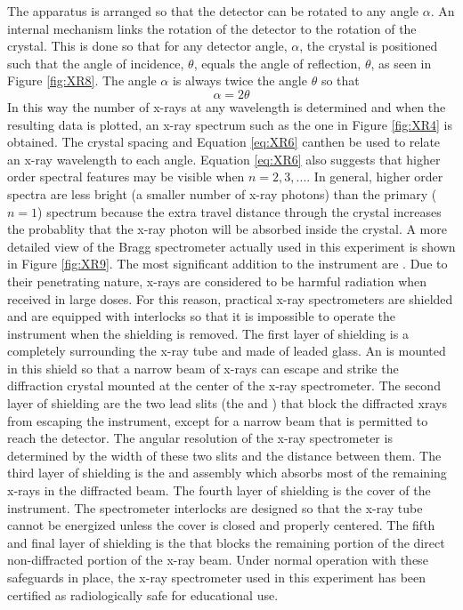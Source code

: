 \documentclass[12pt, a4paper, oneside, openright, titlepage]{book}
\begin{document}
\noindent The apparatus is arranged so that the detector can be rotated to any angle $\alpha$. An internal mechanism links the rotation of the detector to the rotation of the crystal. This is done so that for any detector angle, $\alpha$, the crystal is positioned such that the angle of incidence, $\theta$, equals the angle of reflection, $\theta$, as seen in Figure \ref{fig:XR8}. The angle $\alpha$ is always twice the angle $\theta$ so that \begin{equation}\label{eq:XR7}
    \alpha = 2\theta
\end{equation}
In this way the number of x-rays at any wavelength is determined and when the resulting data is plotted, an x-ray spectrum such as the one in Figure \ref{fig:XR4} is obtained. The crystal spacing and Equation \ref{eq:XR6} canthen be used to relate an x-ray wavelength to each angle. Equation \ref{eq:XR6} also suggests that higher order spectral features may be visible when $n = 2, 3, ... $. In general, higher order spectra are less bright (a smaller number of x-ray photons) than the primary ($n = 1$) spectrum because the extra travel distance through the crystal increases the probablity that the x-ray photon will be absorbed inside the crystal. A more detailed view of the Bragg spectrometer actually used in this experiment is shown in Figure \ref{fig:XR9}. The most significant addition to the instrument are . Due to their penetrating nature, x-rays are considered to be harmful radiation when received in large doses. For this reason, practical x-ray spectrometers are shielded and are equipped with interlocks so that it is impossible to operate the instrument when the shielding is removed. The first layer of shielding is a  completely surrounding the x-ray tube and made of leaded glass. An  is mounted in this shield so that a narrow beam of x-rays can escape and strike the diffraction crystal mounted at the center of the x-ray spectrometer. The second layer of shielding are the two lead slits (the  and ) that block the diffracted xrays from escaping the instrument, except for a narrow beam that is permitted to reach the detector. The angular resolution of the x-ray spectrometer is determined by the width of these two slits and the distance between them. The third layer of shielding is the  and  assembly which absorbs most of the remaining x-rays in the diffracted beam. The fourth layer of shielding is the cover of the instrument. The spectrometer interlocks are designed so that the x-ray tube cannot be energized unless the cover is closed and properly centered. The fifth and final layer of shielding is the  that blocks the remaining portion of the direct non-diffracted portion of the x-ray beam. Under normal operation with these safeguards in place, the x-ray spectrometer used in this experiment has been certified as radiologically safe for educational use.
\end{document}
